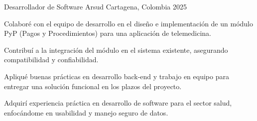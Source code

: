 

\begin{cventries}
  \cventry
    {Desarrollador de Software}
    {Arsud}
    {Cartagena, Colombia}
    {2025}
    {
      \begin{cvitems}
        \item {Colaboré con el equipo de desarrollo en el diseño e implementación de un módulo PyP (Pagos y Procedimientos) para una aplicación de telemedicina.}
        \item {Contribuí a la integración del módulo en el sistema existente, asegurando compatibilidad y confiabilidad.}
        \item {Apliqué buenas prácticas en desarrollo back-end y trabajo en equipo para entregar una solución funcional en los plazos del proyecto.}
        \item {Adquirí experiencia práctica en desarrollo de software para el sector salud, enfocándome en usabilidad y manejo seguro de datos.}
      \end{cvitems}
    }
\end{cventries}
